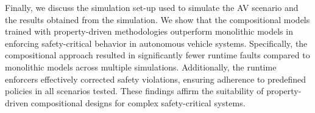 Finally, we discuss the simulation set-up used to simulate the AV scenario and the results obtained from the simulation. We show that the compositional models trained with property-driven methodologies outperform monolithic models in enforcing safety-critical behavior in autonomous vehicle systems. Specifically, the compositional approach resulted in significantly fewer runtime faults compared to monolithic models across multiple simulations. Additionally, the runtime enforcers effectively corrected safety violations, ensuring adherence to predefined policies in all scenarios tested. These findings affirm the suitability of property-driven compositional designs for complex safety-critical systems. 

